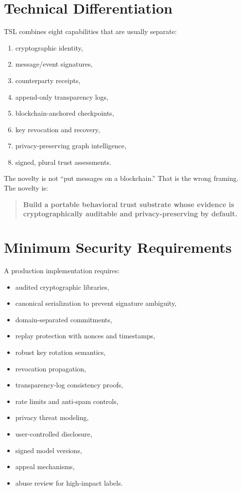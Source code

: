 \documentclass[11pt]{article}
\newcommand{\TSL}{\textsc{TSL}}
\begin{document}
\section{Technical Differentiation}

\TSL{} combines eight capabilities that are usually separate:

\begin{enumerate}
    \item cryptographic identity,
    \item message/event signatures,
    \item counterparty receipts,
    \item append-only transparency logs,
    \item blockchain-anchored checkpoints,
    \item key revocation and recovery,
    \item privacy-preserving graph intelligence,
    \item signed, plural trust assessments.
\end{enumerate}

The novelty is not ``put messages on a blockchain.'' That is the wrong framing. The novelty is:

\begin{quote}
\textbf{Build a portable behavioral trust substrate whose evidence is cryptographically auditable and privacy-preserving by default.}
\end{quote}

\section{Minimum Security Requirements}

A production implementation requires:

\begin{itemize}
    \item audited cryptographic libraries,
    \item canonical serialization to prevent signature ambiguity,
    \item domain-separated commitments,
    \item replay protection with nonces and timestamps,
    \item robust key rotation semantics,
    \item revocation propagation,
    \item transparency-log consistency proofs,
    \item rate limits and anti-spam controls,
    \item privacy threat modeling,
    \item user-controlled disclosure,
    \item signed model versions,
    \item appeal mechanisms,
    \item abuse review for high-impact labels.
\end{itemize}
\end{document}
